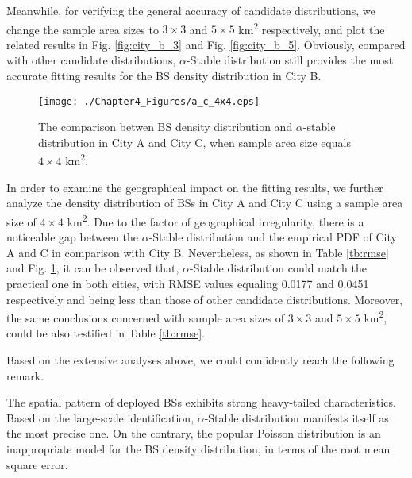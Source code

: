 Meanwhile, for verifying the general accuracy of candidate distributions, we change the sample area sizes to $3\times3$ and $5\times5$ km\textsuperscript{2} respectively, and plot the related results in Fig. \ref{fig:city_b_3} and Fig. \ref{fig:city_b_5}. Obviously, compared with other candidate distributions, $\alpha$-Stable distribution still provides the most accurate fitting results for the BS density distribution in City B.

\begin{figure}
\centering
\setlength\abovecaptionskip{0pt}
\setlength\belowcaptionskip{-5pt}
\texttt{[image: ./Chapter4\_Figures/a\_c\_4x4.eps]}
\caption{The comparison betwen BS density distribution and $\alpha$-stable distribution in City A and City C, when sample area size equals $4\times4$ km\textsuperscript{2}.}
\label{fig:4x4}
\end{figure}

In order to examine the geographical impact on the fitting results, we further analyze the density distribution of BSs in City A and City C using a sample area size of $4\times4$ km\textsuperscript{2}. Due to the factor of geographical irregularity, there is a noticeable gap between the $\alpha$-Stable distribution and the empirical PDF of City A and C in comparison with City B. Nevertheless, as shown in Table \ref{tb:rmse} and Fig. \ref{fig:4x4}, it can be observed that, $\alpha$-Stable distribution could match the practical one in both cities, with RMSE values equaling 0.0177 and 0.0451 respectively and being less than those of other candidate distributions. Moreover, the same conclusions concerned with sample area sizes of $3\times3$ and $5\times5$ km\textsuperscript{2}, could be also testified in Table \ref{tb:rmse}.

Based on the extensive analyses above, we could confidently reach the following remark.
\begin{remark}
The spatial pattern of deployed BSs exhibits strong heavy-tailed characteristics. Based on the large-scale identification, $\alpha$-Stable distribution manifests itself as the most precise one. On the contrary, the popular Poisson distribution is an inappropriate model for the BS density distribution, in terms of the root mean square error.
\end{remark}

\vspace{-5pt}
